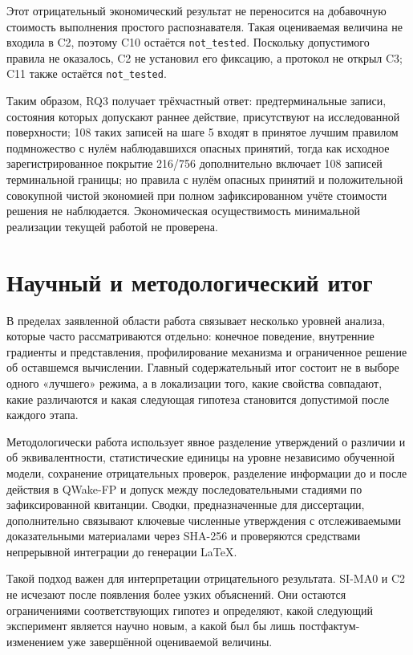 Этот отрицательный экономический результат не переносится на добавочную
стоимость выполнения простого распознавателя. Такая оцениваемая величина не
входила в C2, поэтому C10 остаётся \texttt{not\_tested}. Поскольку допустимого
правила не оказалось, C2 не установил его фиксацию, а протокол не открыл C3;
C11 также остаётся \texttt{not\_tested}.

Таким образом, RQ3 получает трёхчастный ответ: предтерминальные записи,
состояния которых допускают раннее действие, присутствуют на исследованной
поверхности; 108 таких записей на шаге 5 входят в принятое лучшим правилом подмножество с нулём
наблюдавшихся опасных принятий, тогда как исходное зарегистрированное покрытие
216/756 дополнительно включает 108 записей терминальной границы; но правила с
нулём опасных принятий и положительной совокупной чистой экономией при полном
зафиксированном учёте стоимости решения не наблюдается.
Экономическая осуществимость минимальной реализации текущей работой не
проверена.

\section{Научный и методологический итог}
\label{sec:conclusion-contribution}

В пределах заявленной области работа связывает несколько уровней анализа,
которые часто рассматриваются отдельно: конечное поведение, внутренние
градиенты и представления, профилирование механизма и ограниченное решение об
оставшемся вычислении. Главный содержательный итог состоит не в выборе одного
«лучшего» режима, а в локализации того, какие свойства совпадают, какие
различаются и какая следующая гипотеза становится допустимой после каждого
этапа.

Методологически работа использует явное разделение утверждений о различии и об
эквивалентности, статистические единицы на уровне независимо обученной модели,
сохранение отрицательных проверок, разделение информации до и после действия в
QWake-FP и допуск между последовательными стадиями по зафиксированной квитанции.
Сводки, предназначенные для диссертации, дополнительно связывают ключевые
численные утверждения с отслеживаемыми доказательными материалами через
SHA-256 и проверяются средствами непрерывной интеграции до генерации LaTeX.

Такой подход важен для интерпретации отрицательного результата. SI-MA0 и C2 не
исчезают после появления более узких объяснений. Они остаются ограничениями
соответствующих гипотез и определяют, какой следующий эксперимент является
научно новым, а какой был бы лишь постфактум-изменением уже завершённой
оцениваемой величины.

